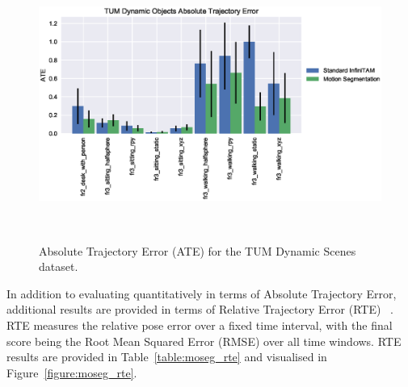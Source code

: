 \begin{figure}[!htbp]
  \centering
  \includegraphics[width=\linewidth]{figures/moseg/ate.eps}
  \caption[Motion Segmentation ATE]
  {Absolute Trajectory Error (ATE) for the TUM Dynamic Scenes dataset.}
~\label{figure:moseg_ate}
\end{figure}

In addition to evaluating quantitatively in terms of Absolute Trajectory Error,
additional results are provided in terms of Relative Trajectory Error (RTE)
~\cite{Sturm2012}. RTE measures the relative pose error over a fixed time
interval, with the final score being the Root Mean Squared Error (RMSE) over all 
time windows. RTE results are provided in Table~\ref{table:moseg_rte} and visualised 
in Figure~\ref{figure:moseg_rte}.

